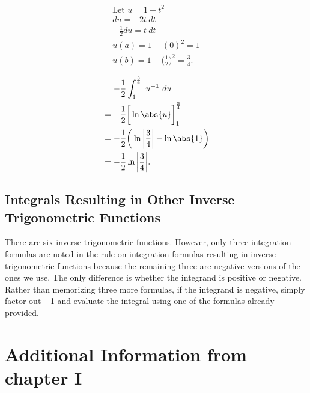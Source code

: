 \documentclass{report}
\begin{document}
       \bigbreak \noindent 
       \begin{minipage}[t]{0.47\textwidth}
       \begin{align*}
           \text{Let $u=1-t^{2}$} \\
           du = -2t\ dt \\
           -\frac{1}{2}du = t\ dt \\
           u(a) = 1-(0)^{2} = 1 \\
           u(b) =  1-\bigg(\frac{1}{2}\bigg)^{2} = \frac{3}{4}
       .\end{align*}
       \end{minipage}
       \begin{minipage}[t]{0.47\textwidth}
        \begin{align*}
          &=-\frac{1}{2}\int_{1}^{\frac{3}{4}}\ u^{-1}\ du \\
           &=-\frac{1}{2}\bigg[\ln{\abs{u}}\bigg]^{\frac{3}{4}}_{1} \\
           &= -\frac{1}{2}\bigg(\ln{\bigg|\frac{3}{4}\bigg|}-\ln{\abs{1}}\bigg) \\ 
           &= -\frac{1}{2}\ln{\bigg|\frac{3}{4}\bigg|}
       .\end{align*}
       \end{minipage}

    

    

    \bigbreak \noindent 
    \subsection{Integrals Resulting in Other Inverse Trigonometric Functions}
    \bigbreak \noindent 
    There are six inverse trigonometric functions. However, only three integration formulas are noted in the rule on integration formulas resulting in inverse trigonometric functions because the remaining three are negative versions of the ones we use. The only difference is whether the integrand is positive or negative. Rather than memorizing three more formulas, if the integrand is negative, simply factor out −1 and evaluate the integral using one of the formulas already provided. 

    \pagebreak \bigbreak \noindent 
    \section{\LARGE Additional Information from chapter I}
\end{document}
